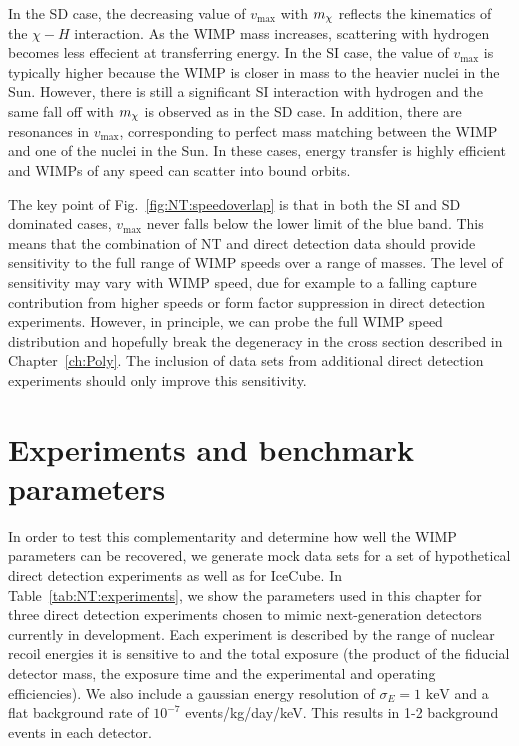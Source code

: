 In the SD case, the decreasing value of $v_\textrm{max}$ with $\mchi$ reflects the kinematics of the $\chi-H$ interaction. As the WIMP mass increases, scattering with hydrogen becomes less effecient at transferring energy. In the SI case, the value of $v_\textrm{max}$ is typically higher because the WIMP is closer in mass to the heavier nuclei in the Sun. However, there is still a significant SI interaction with hydrogen and the same fall off with $\mchi$ is observed as in the SD case. In addition, there are resonances in $v_\textrm{max}$, corresponding to perfect mass matching between the WIMP and one of the nuclei in the Sun. In these cases, energy transfer is highly efficient and WIMPs of any speed can scatter into bound orbits.

The key point of Fig.~\ref{fig:NT:speedoverlap} is that in both the SI and SD dominated cases, $v_\textrm{max}$ never falls below the lower limit of the blue band. This means that the combination of NT and direct detection data should provide sensitivity to the full range of WIMP speeds over a range of masses. The level of sensitivity may vary with WIMP speed, due for example to a falling capture contribution from higher speeds or form factor suppression in direct detection experiments. However, in principle, we can probe the full WIMP speed distribution and hopefully break the degeneracy in the cross section described in Chapter~\ref{ch:Poly}. The inclusion of data sets from additional direct detection experiments should only improve this sensitivity.




\section{Experiments and benchmark parameters}
\label{sec:NT:experiments}
In order to test this complementarity and determine how well the WIMP parameters can be recovered, we generate mock data sets for a set of hypothetical direct detection experiments as well as for IceCube. In Table~\ref{tab:NT:experiments}, we show the parameters used in this chapter for three direct detection experiments chosen to mimic next-generation detectors currently in development. Each experiment is described by the range of nuclear recoil energies it is sensitive to and the total exposure (the product of the fiducial detector mass, the exposure time and the experimental and operating efficiencies). We also include a gaussian energy resolution of $\sigma_E = 1 \textrm{ keV}$ and a flat background rate of $10^{-7}$ events/kg/day/keV. This results in 1-2 background events in each detector. 

